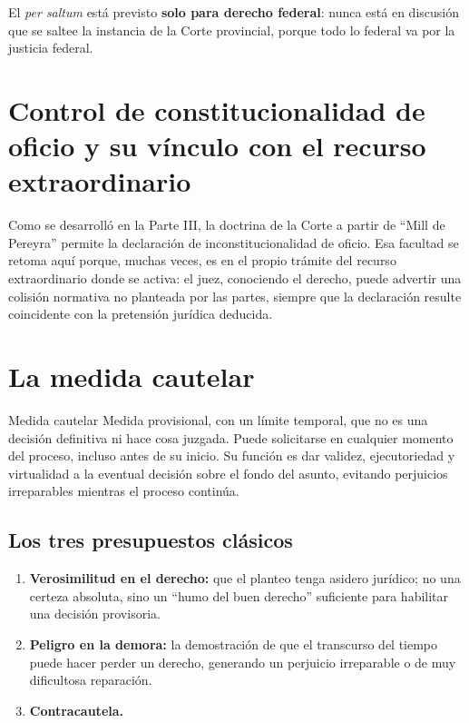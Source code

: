 \documentclass[12pt,oneside]{book}
\begin{document}
El \textit{per saltum} está previsto \textbf{solo para derecho federal}: nunca está en discusión que se saltee la instancia de la Corte provincial, porque todo lo federal va por la justicia federal.

\section{Control de constitucionalidad de oficio y su vínculo con el recurso extraordinario}

Como se desarrolló en la Parte III, la doctrina de la Corte a partir de ``Mill de Pereyra'' permite la declaración de inconstitucionalidad de oficio. Esa facultad se retoma aquí porque, muchas veces, es en el propio trámite del recurso extraordinario donde se activa: el juez, conociendo el derecho, puede advertir una colisión normativa no planteada por las partes, siempre que la declaración resulte coincidente con la pretensión jurídica deducida.

\section{La medida cautelar}

\begin{definition}{Medida cautelar}
Medida provisional, con un límite temporal, que no es una decisión definitiva ni hace cosa juzgada. Puede solicitarse en cualquier momento del proceso, incluso antes de su inicio. Su función es dar validez, ejecutoriedad y virtualidad a la eventual decisión sobre el fondo del asunto, evitando perjuicios irreparables mientras el proceso continúa.
\end{definition}

\subsection{Los tres presupuestos clásicos}

\begin{enumerate}
    \item \textbf{Verosimilitud en el derecho:} que el planteo tenga asidero jurídico; no una certeza absoluta, sino un ``humo del buen derecho'' suficiente para habilitar una decisión provisoria.
    \item \textbf{Peligro en la demora:} la demostración de que el transcurso del tiempo puede hacer perder un derecho, generando un perjuicio irreparable o de muy dificultosa reparación.
    \item \textbf{Contracautela.}
\end{enumerate}
\end{document}
